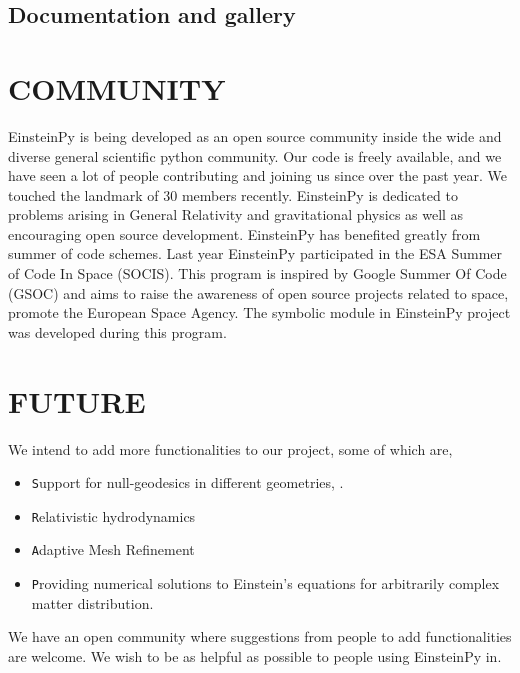 \documentclass{aastex63}
\begin{document}
\subsection{ Documentation and gallery} \label{subsec:doc}

\section{COMMUNITY} \label{sec:COMMUNITY}
EinsteinPy is being developed as an open source community inside the wide and diverse general scientific python community. Our code is freely available, and we have seen a lot of people contributing and joining us since over the past year.
We touched the landmark of 30 members recently. EinsteinPy is dedicated to problems arising in General Relativity and gravitational physics as well as encouraging open source development. EinsteinPy has benefited greatly from summer of code schemes. Last year EinsteinPy participated in the ESA Summer of Code In Space (SOCIS). This program is inspired by Google Summer Of Code (GSOC) and aims to raise the awareness of open source projects related to space, promote the European Space Agency. The symbolic module in EinsteinPy project was developed during this program.

\section{FUTURE} \label{sec:FUTURE}
We intend to add more functionalities to our project, some of which are, 
\begin{itemize}
\item \texttt Support for null-geodesics in different geometries, . 
\item \texttt Relativistic hydrodynamics
\item \texttt Adaptive Mesh Refinement 
\item \texttt Providing numerical solutions to Einstein’s equations for arbitrarily complex matter distribution.
\end{itemize}

We have an open community where suggestions from people to add functionalities are welcome. We wish to be as helpful as possible to people using EinsteinPy in.
\end{document}
